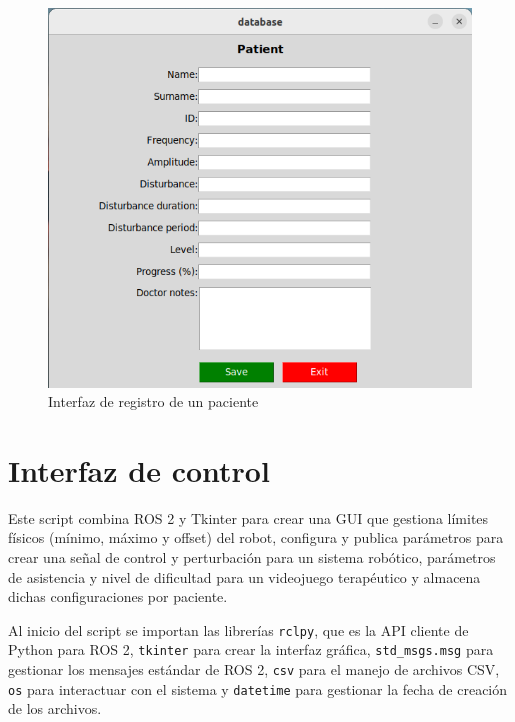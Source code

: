 \begin{figure}[ht!]
	\centering
	\begin{minipage}{0.75\linewidth}
		\centering
		\includegraphics[width=\linewidth]{figs/registro.png}
	\end{minipage}
	\caption[Interfaz de registro de un paciente]{Interfaz de registro de un paciente}
	\label{fig:database}
\end{figure}

\section{Interfaz de control}
\label{section:controller}

Este script combina ROS 2 y Tkinter para crear una GUI que gestiona límites físicos (mínimo, máximo y offset) del robot, configura y publica parámetros para crear una señal de control y perturbación para un sistema robótico, parámetros de asistencia y nivel de dificultad para un videojuego terapéutico y almacena dichas configuraciones por paciente.

Al inicio del script se importan las librerías \verb|rclpy|, que es la API cliente de Python para ROS 2, \verb|tkinter| para crear la interfaz gráfica, \verb|std_msgs.msg| para gestionar los mensajes estándar de ROS 2, \verb|csv| para el manejo de archivos CSV, \verb|os| para interactuar con el sistema y \verb|datetime| para gestionar la fecha de creación de los archivos.

